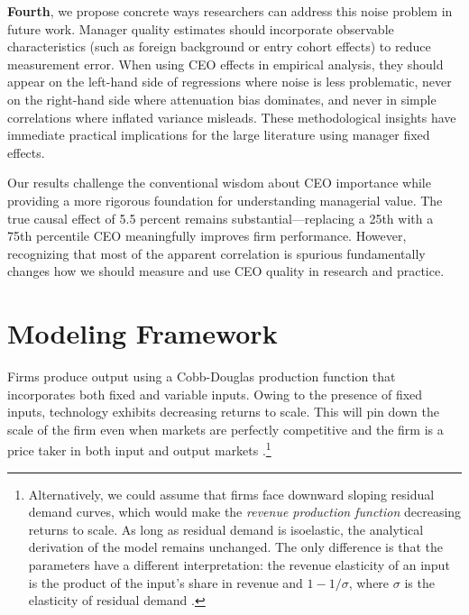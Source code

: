 \documentclass[11pt,a4paper]{article}
\begin{document}
\textbf{Fourth}, we propose concrete ways researchers can address this noise problem in future work. Manager quality estimates should incorporate observable characteristics (such as foreign background or entry cohort effects) to reduce measurement error. When using CEO effects in empirical analysis, they should appear on the left-hand side of regressions where noise is less problematic, never on the right-hand side where attenuation bias dominates, and never in simple correlations where inflated variance misleads. These methodological insights have immediate practical implications for the large literature using manager fixed effects.

Our results challenge the conventional wisdom about CEO importance while providing a more rigorous foundation for understanding managerial value. The true causal effect of 5.5 percent remains substantial---replacing a 25th with a 75th percentile CEO meaningfully improves firm performance. However, recognizing that most of the apparent correlation is spurious fundamentally changes how we should measure and use CEO quality in research and practice.


\section{Modeling Framework}
Firms produce output using a Cobb-Douglas production function that incorporates both fixed and variable inputs. Owing to the presence of fixed inputs, technology exhibits decreasing returns to scale. This will pin down the scale of the firm even when markets are perfectly competitive and the firm is a price taker in both input and output markets \citep{AtkesonKehoe2005JPE,McGrattan2012RED}.\footnote{Alternatively, we could assume that firms face downward sloping residual demand curves, which would make the \emph{revenue production function} decreasing returns to scale. As long as residual demand is isoelastic, the analytical derivation of the model remains unchanged. The only difference is that the parameters have a different interpretation: the revenue elasticity of an input is the product of the input's share in revenue and $1-1/\sigma$, where $\sigma$ is the elasticity of residual demand \citep{DeLoecker2011Econometrica}.}
\end{document}
